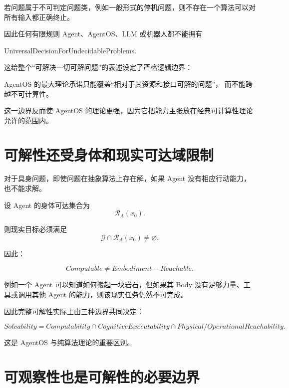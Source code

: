 若问题属于不可判定问题类，例如一般形式的停机问题，则不存在一个算法可以对所有输入都正确终止。

因此任何有限规则 Agent、AgentOS、LLM 或机器人都不能拥有
\begin{statementbox}
UniversalDecisionForUndecidableProblems.
\end{statementbox}

这给整个“可解决一切可解问题”的表述设定了严格逻辑边界：

\begin{statementbox}
AgentOS 的最大理论承诺只能覆盖“相对于其资源和接口可解的问题”，
而不能跨越不可计算性。
\end{statementbox}

这一边界反而使 AgentOS 的理论更强，因为它把能力主张放在经典可计算性理论允许的范围内。

\section{可解性还受身体和现实可达域限制}

对于具身问题，即使问题在抽象算法上存在解，如果 Agent 没有相应行动能力，也不能求解。

设 Agent 的身体可达集合为
\begin{equation}
\mathcal R_A(x_0).
\end{equation}

则现实目标必须满足
\begin{equation}
\mathcal G
\cap
\mathcal R_A(x_0)
\neq
\varnothing.
\end{equation}

因此：

\begin{equation}
\boxed{
Computable
\neq
Embodiment-Reachable.
}
\end{equation}

例如一个 Agent 可以知道如何搬起一块岩石，但如果其 Body 没有足够力量、工具或调用其他 Agent 的能力，则该现实任务仍然不可完成。

因此完整可解性实际上由三种边界共同决定：

\begin{equation}
\boxed{
Solvability
=
Computability
\cap
CognitiveExecutability
\cap
Physical/OperationalReachability.
}
\end{equation}

这是 AgentOS 与纯算法理论的重要区别。

\section{可观察性也是可解性的必要边界}

